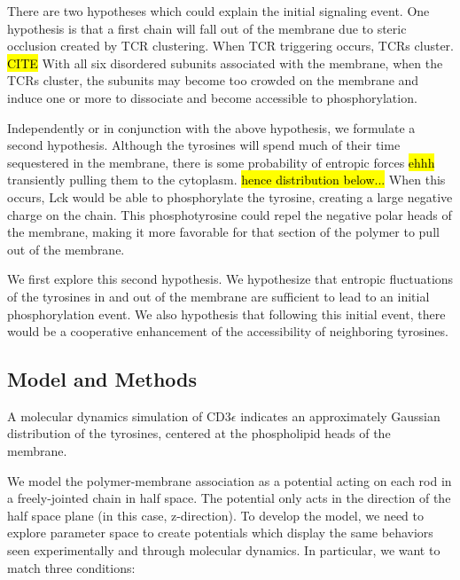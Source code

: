 \documentclass[../../AdvancementSummary.tex]{subfiles}
\begin{document}
There are two hypotheses which could explain the initial signaling event. One hypothesis is that a first chain will fall out of the membrane due to steric occlusion created by TCR clustering. When TCR triggering occurs, TCRs cluster. \hl{CITE} With all six disordered subunits associated with the membrane, when the TCRs cluster, the subunits may become too crowded on the membrane and induce one or more to dissociate and become accessible to phosphorylation. 

Independently or in conjunction with the above hypothesis, we formulate a second hypothesis. Although the tyrosines will spend much of their time sequestered in the membrane, there is some probability of entropic forces \hl{ehhh} transiently pulling them to the cytoplasm. \hl{hence distribution below...} When this occurs, Lck would be able to phosphorylate the tyrosine, creating a large negative charge on the chain. This phosphotyrosine could repel the negative polar heads of the membrane, making it more favorable for that section of the polymer to pull out of the membrane.  

We first explore this second hypothesis. We hypothesize that entropic fluctuations of the tyrosines in and out of the membrane are sufficient to lead to an initial phosphorylation event. We also hypothesis that following this initial event, there would be a cooperative enhancement of the accessibility of neighboring tyrosines.


\subsection{Model and Methods}


A molecular dynamics simulation of CD3$\epsilon$ indicates an approximately Gaussian distribution of the tyrosines, centered at the phospholipid heads of the membrane. \cite{Lopez2015}

We model the polymer-membrane association as a potential acting on each rod in a freely-jointed chain in half space. The potential only acts in the direction of the half space plane (in this case, z-direction). To develop the model, we need to explore parameter space to create potentials which display the same behaviors seen experimentally and through molecular dynamics. In particular, we want to match three conditions:
\end{document}
